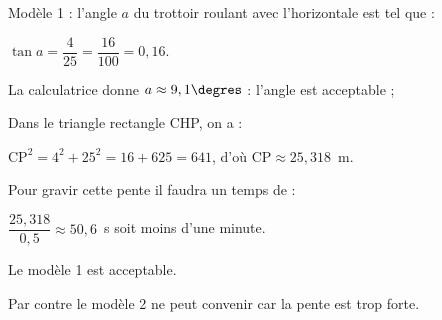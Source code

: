
\medskip
 

% 
% 
% 
%
%
 

Modèle 1 : l’angle $a$ du trottoir roulant avec l’horizontale est tel que :

$\tan a = \dfrac{4}{25} = \dfrac{16}{100} = 0,16$.

La calculatrice donne $a \approx 9,1\degres$ : l’angle est acceptable ;

Dans le triangle rectangle CHP, on a :

$\text{CP}^2 = 4^2 + 25^2 = 16 + 625 = 641$, d’où $\text{CP} \approx 25,318$~m.

Pour gravir cette pente il faudra un temps de :

$\dfrac{25,318}{0,5}  \approx 50,6$~s soit moins d’une minute. 

Le modèle 1 est acceptable.

Par contre le modèle 2 ne peut convenir car la pente est trop forte.
